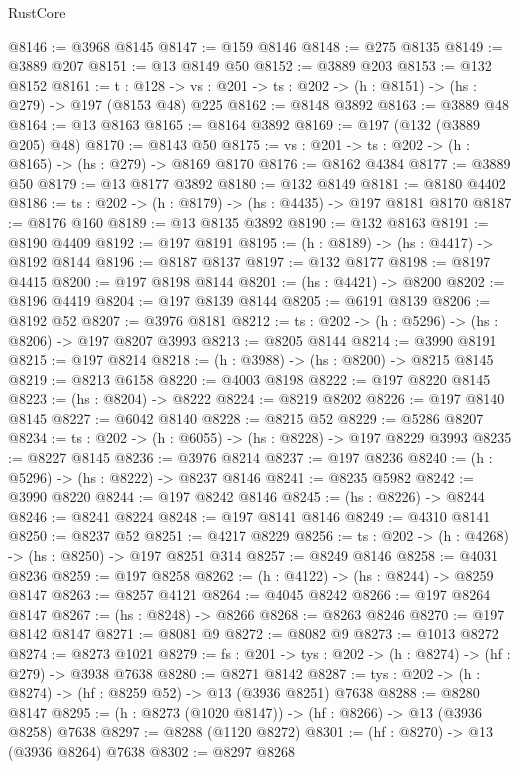 \begin{lexlean}{RustCore}
\begin{coremodule}
@8146 := @3968 @8145
@8147 := @159 @8146
@8148 := @275 @8135
@8149 := @3889 @207
@8151 := @13 @8149 @50
@8152 := @3889 @203
@8153 := @132 @8152
@8161 := {t : @128} ->
  {vs : @201} -> {ts : @202} -> (h : @8151) -> (hs : @279) -> @197 (@8153 @48) @225
@8162 := @8148 @3892
@8163 := @3889 @48
@8164 := @13 @8163
@8165 := @8164 @3892
@8169 := @197 (@132 (@3889 @205) @48)
@8170 := @8143 @50
@8175 := {vs : @201} -> {ts : @202} -> (h : @8165) -> (hs : @279) -> @8169 @8170
@8176 := @8162 @4384
@8177 := @3889 @50
@8179 := @13 @8177 @3892
@8180 := @132 @8149
@8181 := @8180 @4402
@8186 := {ts : @202} -> (h : @8179) -> (hs : @4435) -> @197 @8181 @8170
@8187 := @8176 @160
@8189 := @13 @8135 @3892
@8190 := @132 @8163
@8191 := @8190 @4409
@8192 := @197 @8191
@8195 := (h : @8189) -> (hs : @4417) -> @8192 @8144
@8196 := @8187 @8137
@8197 := @132 @8177
@8198 := @8197 @4415
@8200 := @197 @8198 @8144
@8201 := (hs : @4421) -> @8200
@8202 := @8196 @4419
@8204 := @197 @8139 @8144
@8205 := @6191 @8139
@8206 := @8192 @52
@8207 := @3976 @8181
@8212 := {ts : @202} -> (h : @5296) -> (hs : @8206) -> @197 @8207 @3993
@8213 := @8205 @8144
@8214 := @3990 @8191
@8215 := @197 @8214
@8218 := (h : @3988) -> (hs : @8200) -> @8215 @8145
@8219 := @8213 @6158
@8220 := @4003 @8198
@8222 := @197 @8220 @8145
@8223 := (hs : @8204) -> @8222
@8224 := @8219 @8202
@8226 := @197 @8140 @8145
@8227 := @6042 @8140
@8228 := @8215 @52
@8229 := @5286 @8207
@8234 := {ts : @202} -> (h : @6055) -> (hs : @8228) -> @197 @8229 @3993
@8235 := @8227 @8145
@8236 := @3976 @8214
@8237 := @197 @8236
@8240 := (h : @5296) -> (hs : @8222) -> @8237 @8146
@8241 := @8235 @5982
@8242 := @3990 @8220
@8244 := @197 @8242 @8146
@8245 := (hs : @8226) -> @8244
@8246 := @8241 @8224
@8248 := @197 @8141 @8146
@8249 := @4310 @8141
@8250 := @8237 @52
@8251 := @4217 @8229
@8256 := {ts : @202} -> (h : @4268) -> (hs : @8250) -> @197 @8251 @314
@8257 := @8249 @8146
@8258 := @4031 @8236
@8259 := @197 @8258
@8262 := (h : @4122) -> (hs : @8244) -> @8259 @8147
@8263 := @8257 @4121
@8264 := @4045 @8242
@8266 := @197 @8264 @8147
@8267 := (hs : @8248) -> @8266
@8268 := @8263 @8246
@8270 := @197 @8142 @8147
@8271 := @8081 @9
@8272 := @8082 @9
@8273 := @1013 @8272
@8274 := @8273 @1021
@8279 := {fs : @201} -> {tys : @202} -> (h : @8274) -> (hf : @279) -> @3938 @7638
@8280 := @8271 @8142
@8287 := {tys : @202} -> (h : @8274) -> (hf : @8259 @52) -> @13 (@3936 @8251) @7638
@8288 := @8280 @8147
@8295 := (h : @8273 (@1020 @8147)) -> (hf : @8266) -> @13 (@3936 @8258) @7638
@8297 := @8288 (@1120 @8272)
@8301 := (hf : @8270) -> @13 (@3936 @8264) @7638
@8302 := @8297 @8268

\end{coremodule}
\end{lexlean}
